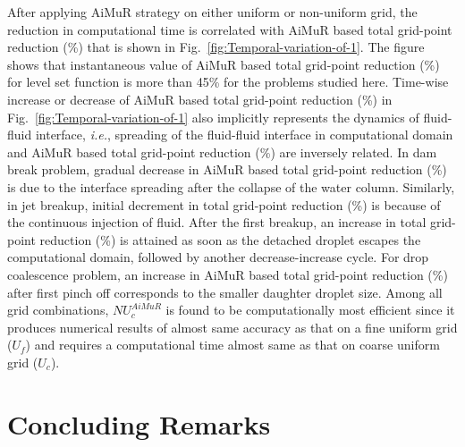 \documentclass[preprint,12pt]{elsarticle}
\begin{document}
After applying AiMuR strategy
on either uniform or non-uniform grid, the reduction in computational time is correlated with AiMuR based total grid-point
reduction (\%) that is shown in Fig.~\ref{fig:Temporal-variation-of-1}. The figure shows that instantaneous value of AiMuR based total grid-point
reduction (\%) for level set function is more than 45\% for the problems studied here. Time-wise increase or decrease of AiMuR based total grid-point reduction
(\%) in Fig.~\ref{fig:Temporal-variation-of-1} also implicitly represents
the dynamics of fluid-fluid interface, \emph{i.e.}, spreading of the fluid-fluid interface in computational domain and AiMuR based total grid-point reduction (\%) are inversely related. In dam break problem, gradual
decrease in AiMuR based total grid-point reduction (\%) is due to
the interface spreading after the collapse of the water column. Similarly,
in jet breakup, initial decrement in total grid-point reduction (\%)
is because of the continuous injection of fluid. After the first breakup,
an increase in total grid-point reduction (\%) is attained as soon as the detached droplet escapes the computational domain, followed by another
decrease-increase cycle. For drop coalescence problem, an increase in
AiMuR based total grid-point reduction (\%) after first pinch off
corresponds to the smaller daughter droplet size. Among all grid combinations,
$NU_{c}^{AiMuR}$ is found to be computationally most efficient since it produces
numerical results of almost same accuracy as that on a fine uniform grid ($U_{f}$)
and requires a computational time almost same as that on coarse uniform grid
($U_{c}$).

\section*{Concluding Remarks}
\end{document}

